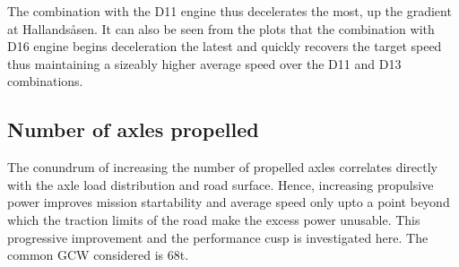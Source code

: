 \documentclass{article}
\begin{document}
The combination with the D11 engine thus decelerates the most, up the gradient at Hallands\aa sen. It can also be seen from the plots that the combination with D16 engine begins deceleration the latest and quickly recovers the target speed thus maintaining a sizeably higher average speed over the D11 and D13 combinations.

\subsection{Number of axles propelled}

The conundrum of increasing the number of propelled axles correlates directly with the axle load distribution and road surface. Hence, increasing propulsive power improves mission startability and average speed only upto a point beyond which the traction limits of the road make the excess power unusable. This progressive improvement and the performance cusp is investigated here. The common GCW considered is 68t.\\
\end{document}
